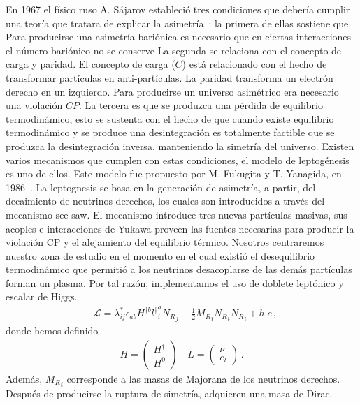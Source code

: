 En 1967 el físico ruso A. Sájarov estableció tres condiciones que debería cumplir una teoría que tratara de explicar la asimetría~\cite{Sakharov:1967dj}: la primera de ellas sostiene que Para producirse una asimetría bariónica  es necesario que en ciertas interacciones el número bariónico no se conserve 
%
%
%
La segunda se relaciona con el concepto de carga y paridad. El concepto de carga ($C$) está relacionado con el hecho de transformar partículas en anti-partículas. La paridad transforma un electrón derecho en un izquierdo. Para producirse un universo asimétrico era necesario una violación $CP$. La tercera es que se produzca una pérdida de equilibrio termodinámico, esto se sustenta con el hecho de que cuando existe equilibrio termodinámico y se produce una desintegración es totalmente factible que se produzca la desintegración inversa, manteniendo la simetría del universo.
Existen varios mecanismos que  cumplen con estas condiciones, el modelo de leptogénesis es uno de ellos. Este modelo fue propuesto por M.  Fukugita y T. Yanagida,  en 1986~\cite{Fukugita:1986hr}. La leptognesis se basa en la generación de asimetría, a partir, del decaimiento de neutrinos derechos, los cuales son introducidos a través del mecanismo see-saw. El mecanismo introduce tres nuevas partículas masivas, sus acoples e interacciones de Yukawa proveen las fuentes necesarias para producir la violación CP y el alejamiento del equilibrio térmico.
Nosotros centraremos nuestro zona de estudio en el momento en el cual existió el desequilibrio termodinámico que permitió a los neutrinos desacoplarse de las demás partículas forman un plasma. Por tal razón, implementamos el uso de doblete leptónico y escalar de Higgs.
%
\begin{align}
-\mathcal{L}=\lambda_{ij}^*\epsilon_{ab}   H^{\dagger b}{l^\dagger}^a_i {N_R}_j+\frac{1}{2}{M_R}_i {N_R}_i {N_R}_i+h.c \, ,
\end{align}
donde hemos definido
\begin{align}
  H=\begin{pmatrix}
H^{\dagger}\\
H^{0}
\end{pmatrix}\, & L=\begin{pmatrix}
\nu\\
e_{l}
\end{pmatrix}\, . 
\end{align}
%
Además, ${M_R}_i$ corresponde a las masas de Majorana de los neutrinos derechos. Después de producirse la ruptura de simetría, adquieren una masa de Dirac. 
